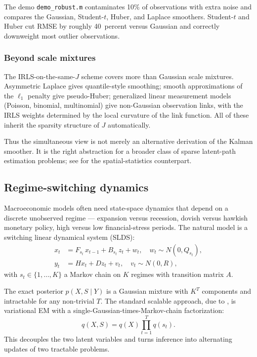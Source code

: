 \documentclass[11pt]{article}
\begin{document}
The demo \texttt{demo\_robust.m} contaminates 10\% of observations
with extra noise and compares the Gaussian, Student-$t$, Huber, and
Laplace smoothers.  Student-$t$ and Huber cut RMSE by roughly
40~percent versus Gaussian and correctly downweight most outlier
observations.

\subsubsection{Beyond scale mixtures}

The IRLS-on-the-same-$J$ scheme covers more than Gaussian scale
mixtures.  Asymmetric Laplace gives quantile-style smoothing; smooth
approximations of the $\ell_1$ penalty give pseudo-Huber; generalized
linear measurement models (Poisson, binomial, multinomial) give
non-Gaussian observation links, with the IRLS weights determined by
the local curvature of the link function.  All of these inherit the
sparsity structure of $J$ automatically.

Thus the simultaneous view is not merely an alternative derivation of
the Kalman smoother.  It is the right abstraction for a broader class
of sparse latent-path estimation problems; see \citet{RueHeld2005} for
the spatial-statistics counterpart.

\subsection{Regime-switching dynamics}
\label{sec:slds}

Macroeconomic models often need state-space dynamics that depend on a
discrete unobserved regime --- expansion versus recession, dovish
versus hawkish monetary policy, high versus low financial-stress
periods.  The natural model is a switching linear dynamical system
(SLDS):
\begin{align}
x_t &= F_{s_t}\,x_{t-1}+B_{s_t}\,z_t+w_t,
        \quad w_t\sim N(0,Q_{s_t}),\\
y_t &= H x_t+D z_t+v_t,\quad v_t\sim N(0,R),
\end{align}
with $s_t\in\{1,\ldots,K\}$ a Markov chain on $K$ regimes with
transition matrix $A$.

The exact posterior $p(X,S\mid Y)$ is a Gaussian mixture with $K^T$
components and intractable for any non-trivial $T$.  The standard
scalable approach, due to \citet{GhahramaniHinton2000}, is variational
EM with a single-Gaussian-times-Markov-chain factorization:
\begin{equation}
q(X,S)=q(X)\prod_{t=1}^T q(s_t).
\end{equation}
This decouples the two latent variables and turns inference into
alternating updates of two tractable problems.
\end{document}
